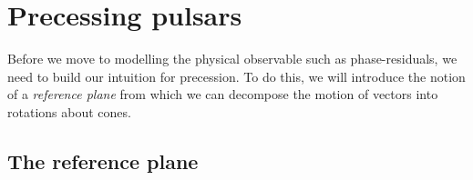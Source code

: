 \documentclass[../full_thesis/full_thesis.tex]{subfiles}
\begin{document}
%




\section{Precessing pulsars}
\label{sec: precessing pulsars}
Before we move to modelling the physical observable such as phase-residuals,
we need to build our intuition for precession. To do this, we will introduce
the notion of a \emph{reference plane} from which we can decompose the motion of
vectors into rotations about cones.

\subsection{The reference plane}
\label{sec: reference plane}
\end{document}
